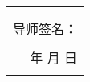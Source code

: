 \begin{table}[H]
\begin{tabular}{|rrrrrr|}
    \multicolumn{6}{|r|}{} \\
    \multicolumn{6}{|r|}{} \\
    \multicolumn{6}{|p{35.88em}|}{                                                                             \hfill 导师签名：\qquad\qquad\qquad\qquad\qquad\qquad\qquad\qquad } \\
    \multicolumn{6}{|r|}{} \\
    \multicolumn{6}{|p{35.88em}|}{\hfill 年 \qquad\quad 月 \qquad\quad 日 \qquad\qquad\qquad} \\
    \multicolumn{6}{|r|}{} \\
    \hline
    \end{tabular}
\end{table}

\renewcommand\arraystretch{1}